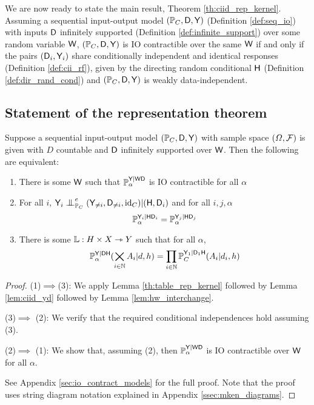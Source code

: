 We are now ready to state the main result, Theorem \ref{th:ciid_rep_kernel}. Assuming a sequential input-output model $(\mathbb{P}_C,\mathsf{D},\mathsf{Y})$ (Definition \ref{def:seq_io}) with inputs $\mathsf{D}$ infinitely supported (Definition \ref{def:infinite_support}) over some random variable $\mathsf{W}$, $(\mathbb{P}_C,\mathsf{D},\mathsf{Y})$ is IO contractible over the same $\mathsf{W}$ if and only if the pairs $(\mathsf{D}_i, \mathsf{Y}_i)$ share conditionally independent and identical responses (Definition \ref{def:cii_rf}), given by the directing random conditional $\mathsf{H}$ (Definition \ref{def:dir_rand_cond}) and $(\mathbb{P}_C,\mathsf{D},\mathsf{Y})$ is weakly data-independent.

\subsection{Statement of the representation theorem}\label{sec:reptheorem_statement}

\begin{theorem}\label{th:ciid_rep_kernel}
Suppose a sequential input-output model $(\mathbb{P}_C,\mathsf{D},\mathsf{Y})$ with sample space $(\Omega,\mathcal{F})$ is given with $D$ countable and $\mathsf{D}$ infinitely supported over $\mathsf{W}$. Then the following are equivalent:
\begin{enumerate}
    \item There is some $\mathsf{W}$ such that $\mathbb{P}_\alpha^{\mathsf{Y}|\mathsf{WD}}$ is IO contractible for all $\alpha$
    \item For all $i$, $\RV{Y}_i\CI^e_{\prob{P}_C} (\RV{Y}_{\neq i},\RV{D}_{\neq i},\text{id}_C)|(\RV{H},\RV{D}_i)$ and for all $i,j, \alpha$ $$\mathbb{P}_\alpha^{\mathsf{Y}_i|\mathsf{H}\mathsf{D}_i}=\mathbb{P}_\alpha^{\mathsf{Y}_j|\mathsf{H}\mathsf{D}_j}$$
    \item There is some $\mathbb{L}:H\times X\rightarrowtriangle Y$ such that for all $\alpha$, $$\mathbb{P}_\alpha^{\mathsf{Y}|\mathsf{DH}}(\bigtimes_{i\in\mathbb{N}} A_{i}|d,h)= \prod_{i\in\mathbb{N}} \mathbb{P}_C^{\mathsf{Y}_1|\mathsf{D}_1\mathsf{H}}(A_i|d_i,h)$$
\end{enumerate}
\end{theorem}

\begin{proof}
(1)$\implies$(3):
We apply Lemma \ref{th:table_rep_kernel} followed by Lemma \ref{lem:ciid_yd} followed by Lemma \ref{lem:hw_interchange}.


(3)$\implies$ (2):
We verify that the required conditional independences hold assuming (3).

(2)$\implies$ (1):
We show that, assuming (2), then $\mathbb{P}_\alpha^{\mathsf{Y}|\mathsf{WD}}$ is IO contractible over $\mathsf{W}$ for all $\alpha$.

See Appendix \ref{sec:io_contract_models} for the full proof. Note that the proof uses string diagram notation explained in Appendix \ref{ssec:mken_diagrams}.
\end{proof}

